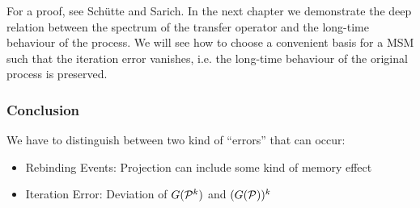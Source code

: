 For a proof, see Sch\"utte and Sarich\cite[p.72]{schutte2013metastability}.
In the next chapter we demonstrate the deep relation between the spectrum of the transfer operator and the long-time behaviour of the process. %
We will see how to choose a convenient basis for a MSM such that the iteration error vanishes, i.e. the long-time behaviour of the original process is preserved. 

\subsubsection*{Conclusion}


We have to distinguish between two kind of ``errors'' that can occur:
\begin{itemize}
\item Rebinding Events: Projection can include some kind of memory effect
\item Iteration Error: Deviation of $G(\mathcal{P}^k)$ and $(G(\mathcal{P}))^k$
\end{itemize}